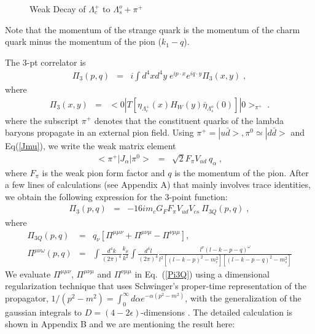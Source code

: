 \documentclass[twoside]{article}
\newcommand{\beq}{\begin{eqnarray}}
\newcommand{\eeq}{\end{eqnarray}}
\begin{document}
\begin{figure}[ht]
\begin{center}
\end{center}
\caption{Weak Decay of $\Lambda^+_c$ to $\Lambda^o_s + \pi^+$ }
\label{Figure 1}
\end{figure}

 Note that the momentum of the strange quark is the momentum of the charm
quark minus the momentum of the pion ($k_1-q$).

The 3-pt correlator is 
\beq
\label{3pt-correlator}
\Pi_3(p,q) &=& i\int d^4x d^4y \; e^{ip \cdot x} e^{iq \cdot y}
\Pi_3(x,y) \; , 
\eeq 
where
\beq
\label{3pt-correlator-x-y}
 \Pi_3(x,y)&=&<0|T[\eta_{\Lambda^+_c}(x) H_W(y) \bar{\eta}_{\Lambda^o_s}(0)]
|0>_{\pi^+} \; .
\eeq
where the subscript $\pi^+$ denotes that the constituent quarks of the lambda 
baryons propagate in an external pion field. 
\noindent
Using $\pi^+=|u\bar{d}>, \pi^0 \simeq|d\bar{d}>$ and Eq(\ref{Jmu})\cite{hhk02},
we write the weak matrix element
\beq
\label{quark-J}
  <\pi^+|J_\alpha|\pi^0>&=& \sqrt{2}F_\pi V_{ud}~ q_\alpha \; ,
\eeq
where $F_\pi$ is the weak pion form factor and $q$ is the momentum of the pion. 
After a few lines of calculations (see Appendix A) that mainly involves trace 
identities, we obtain the following expression for the 3-point function:
\begin{eqnarray}
\Pi_{3}(p, q) &=&
-16 im_c G_F F_\pi V_{ud} V_{cs} ~  \Pi_{3Q}(p,q)
\; ,
\end{eqnarray}
where  
\begin{eqnarray}
\label{Pi3Q}
\Pi_{3Q}(p,q)
&=&
q_\nu \left[
\Pi^{\mu \mu \nu} + \Pi^{\mu \nu \mu} - \Pi^{\nu \mu \mu}
\right] , \\
\label{Pimunuomega}
\Pi^{\mu \nu \omega}(p,q)
&=&
\int \frac{d^4 k}{(2\pi)^4} \frac{k_\mu}{k^2}
\int \frac{d^4 l}{(2 \pi)^4}
\frac{l^\nu (l - k - p - q)^\omega}{l^2 \left[(l - k - p)^2 - m_c^2  \right] 
\left[  (l - k - p - q)^2 - m_s^2\right]}
\end{eqnarray}
We evaluate $\Pi^{\mu \mu \nu}$, $\Pi^{\mu \nu \mu}$ and $\Pi^{\nu \mu \mu}$ in 
Eq.~(\ref{Pi3Q}) using a dimensional regularization technique that uses 
Schwinger's proper-time representation of the propagator, $1/(p^2 - m^2) = 
\int_0^\infty d \alpha e^{-\alpha\left( p^2 - m^2 \right)}$, with the generalization of 
the gaussian integrals to $D=(4 - 2 \epsilon)$-dimensions \cite{Ashmore1973, 
Leibbrandt1975}. The detailed calculation is shown in Appendix B and we are 
mentioning the result here:
\end{document}

